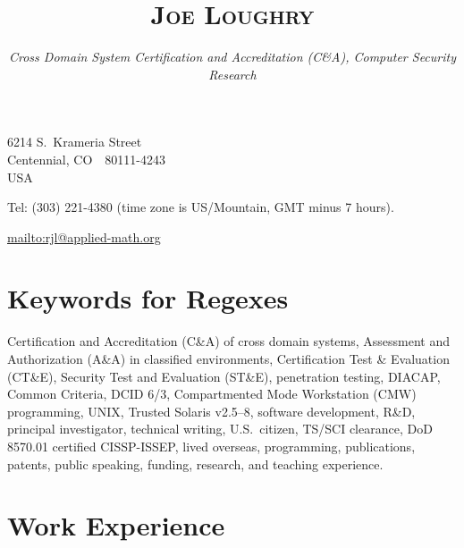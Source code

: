 \documentclass[letterpaper]{article}
\date{}
\title{\textsc{Joe Loughry}\vspace{-5mm}}
\author{\hspace{-4mm}\vspace{-5mm}\emph{Cross Domain System Certification and Accreditation (C\&A),
	Computer Security Research}
}
\begin{document}
\maketitle


\vspace*{-1.25cm}
\hfill 6214 S.\ Krameria Street \\
\hfill Centennial, CO\ \ 80111-4243 \\
\hfill USA 

Tel: (303) 221-4380 (time zone is US/Mountain, GMT minus 7 hours).

\url{mailto:rjl@applied-math.org}

\section*{Keywords for Regexes}

Certification and Accreditation (C\&A) of cross domain systems,
Assessment and Authorization (A\&A) in classified environments,
Certification Test \& Evaluation (CT\&E),
Security Test and Evaluation (ST\&E),
penetration testing,
DIACAP,
Common Criteria,
DCID 6/3,
Compartmented Mode Workstation (CMW) programming,
UNIX,
Trusted Solaris v2.5--8,
software development,
R\&D,
principal investigator,
technical writing,
U.S.\ citizen,
TS/SCI clearance,
DoD 8570.01 certified CISSP-ISSEP,
lived overseas,
programming,
publications,
patents,
public speaking,
funding,
research,
and teaching experience.

\section*{Work Experience} %
\end{document}
